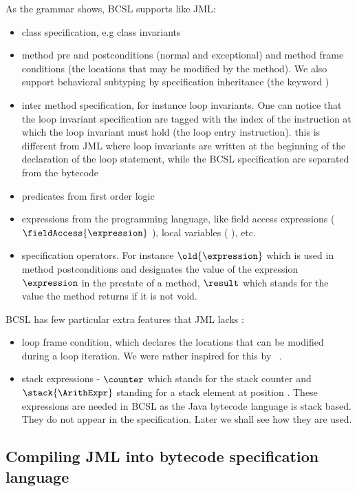  As the grammar shows, BCSL supports like JML: 
\begin{itemize}
   \item class specification, e.g class invariants
   \item  method pre and postconditions (normal and exceptional) and method frame conditions (the locations that may be modified by the method). 
     We also support behavioral subtyping by specification inheritance (the keyword  )
   \item inter method specification, for instance loop invariants. One can notice that the loop invariant specification are tagged with the index of the instruction at which the loop invariant must hold (the loop entry instruction). this is different from  JML
where loop invariants are written at the beginning of the declaration of the loop statement, while the BCSL specification are separated
from the bytecode
   \item predicates from first order logic   
      
\item expressions from the programming language, like field access expressions ($\fieldAccess{\expression}$ ), local variables (  ), etc.
\item specification operators. For instance  $\old{\expression}$ which is used in method postconditions and
 designates the value of the expression $\expression$ in the prestate of a method, $ \result$ which stands for the value the method
returns if it is not void.  
\end{itemize}

BCSL has few particular extra features that JML lacks :
\begin{itemize}
   \item loop frame condition, which declares the locations
that can be modified during a loop iteration. We were rather inspired for this by ~\cite{BRL-JACK}. 

   \item stack expressions - $\counter$ which stands for the stack counter and $\stack{\ArithExpr}$
standing for a stack element at position \ArithExpr. These expressions are needed in BCSL as the Java bytecode language is
stack based.  They do not appear in the specification. Later we shall see how they are used.
\end{itemize}






 
\subsection{Compiling JML into bytecode specification language}\label{comJML}

